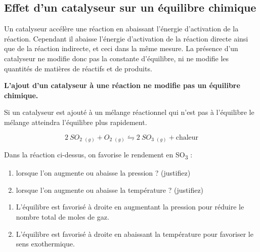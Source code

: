 \documentclass[
  11pt,
  a4paper,
  openany]{book}
\providecommand{\tightlist}{%
  \setlength{\itemsep}{0pt}\setlength{\parskip}{0pt}}
\begin{document}
\subsection{Effet d'un catalyseur sur un équilibre chimique}\label{effet-dun-catalyseur-sur-un-uxe9quilibre-chimique}

Un catalyseur accélère une réaction en abaissant l'énergie d'activation de la réaction. Cependant il abaisse l'énergie d'activation de la réaction directe ainsi que de la réaction indirecte, et ceci dans la même mesure. La présence d'un catalyseur ne modifie donc pas la constante d'équilibre, ni ne modifie les quantités de matières de réactifs et de produits.

\textbf{L'ajout d'un catalyseur à une réaction ne modifie pas un équilibre chimique.}

Si un catalyseur est ajouté à un mélange réactionnel qui n'est pas à l'équilibre le mélange atteindra l'équilibre plus rapidement.

\begin{Exercise}

\[
  2\ SO_2\ _{(g)} + O_2\ _{(g)} \leftrightharpoons 2\ SO_3\ _{(g)} + \text{chaleur}
\]

Dans la réaction ci-dessus, on favorise le rendement en SO\textsubscript{3} :

\begin{enumerate}
\def\labelenumi{\alph{enumi}.}
\tightlist
\item
  lorsque l'on augmente ou abaisse la pression ? (justifiez)
\item
  lorsque l'on augmente ou abaisse la température ? (justifiez)
\end{enumerate}

\end{Exercise}

\begin{Answer}

\begin{enumerate}
\def\labelenumi{\alph{enumi}.}
\tightlist
\item
  L'équilibre est favorisé à droite en augmentant la pression pour réduire le nombre total de moles de gaz.
\item
  L'équilibre est favorisé à droite en abaissant la température pour favoriser le sens exothermique.
\end{enumerate}

\end{Answer}
\end{document}
